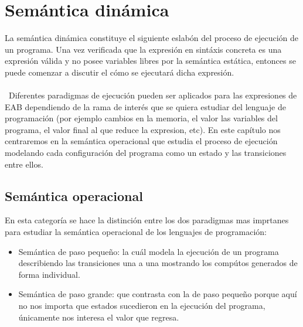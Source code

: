     \section{Semántica dinámica}
    La semántica dinámica constituye el siguiente eslabón del proceso de ejecución de un programa. Una vez verificada que la expresión en sintáxis concreta es una expresión válida y no posee variables libres por la semántica estática, entonces se puede comenzar a discutir el cómo se ejecutará dicha expresión. \\\\\
    Diferentes paradigmas de ejecución pueden ser aplicados para las expresiones de \textsf{EAB} dependiendo de la rama de interés que se quiera estudiar del lenguaje de programación (por ejemplo cambios en la memoria, el valor las variables del programa, el valor final al que reduce la expresion, etc). En este capítulo nos centraremos en la semántica operacional que estudia el proceso de ejecución modelando cada configuración del programa como un estado y las transiciones entre ellos.
    
    
    \subsection{Semántica operacional}
    En esta categoría se hace la distinción entre los dos paradigmas mas imprtanes para estudiar la semántica operacional de los lenguajes de programación:
    \begin{itemize}
        \item Semántica de paso pequeño: la cuál modela la ejecución de un programa describiendo las transiciones una a una mostrando los compútos generados de forma individual. 
        \item Semántica de paso grande: que contrasta con la de paso pequeño porque aquí no nos importa que estados sucedieron en la ejecución del programa, únicamente nos interesa el valor que regresa.
    \end{itemize}


    \bigskip
    
